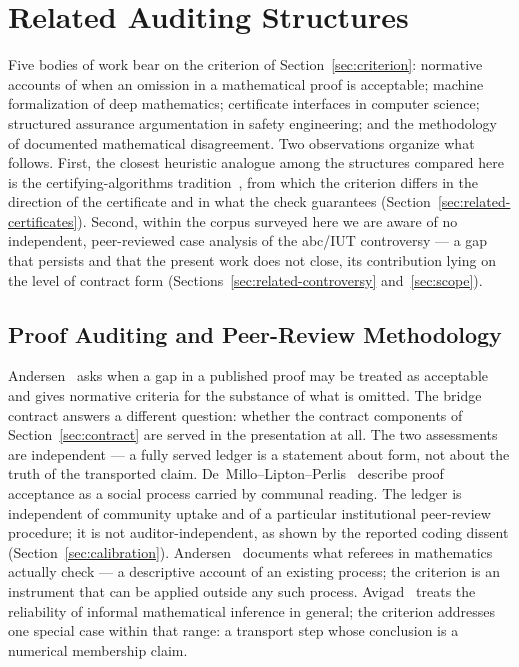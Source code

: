 \documentclass[11pt,a4paper]{article}
\begin{document}
\section{Related Auditing Structures}\label{sec:related}

Five bodies of work bear on the criterion of Section~\ref{sec:criterion}:
normative accounts of when an omission in a mathematical proof is acceptable;
machine formalization of deep mathematics; certificate interfaces in computer
science; structured assurance argumentation in safety engineering; and the
methodology of documented mathematical disagreement. Two observations organize
what follows. First, the closest heuristic analogue among the structures
compared here is the certifying-algorithms tradition~\cite{McConnell2011}, from
which the criterion differs in the direction of the certificate and in what the
check guarantees (Section~\ref{sec:related-certificates}). Second, within the
corpus surveyed here we are aware of no independent, peer-reviewed case analysis
of the abc/IUT controversy --- a gap that persists and that the present work
does not close, its contribution lying on the level of contract form
(Sections~\ref{sec:related-controversy} and~\ref{sec:scope}).

\subsection{Proof Auditing and Peer-Review Methodology}\label{sec:related-audit}

Andersen~\cite{Andersen2020} asks when a gap in a published proof may be treated
as acceptable and gives normative criteria for the substance of what is omitted.
The bridge contract answers a different question: whether the contract
components of Section~\ref{sec:contract} are served in the presentation at all.
The two assessments are independent --- a fully served ledger is a statement
about form, not about the truth of the transported claim.
De~Millo--Lipton--Perlis~\cite{DeMillo1979} describe proof acceptance as a social
process carried by communal reading. The ledger is independent of community
uptake and of a particular institutional peer-review procedure; it is not
auditor-independent, as shown by the reported coding dissent
(Section~\ref{sec:calibration}). Andersen~\cite{Andersen2017} documents what
referees in mathematics actually check --- a descriptive account of an existing
process; the criterion is an instrument that can be applied outside any such
process. Avigad~\cite{Avigad2021}
treats the reliability of informal mathematical inference in general; the
criterion addresses one special case within that range: a transport step whose
conclusion is a numerical membership claim.
\end{document}
